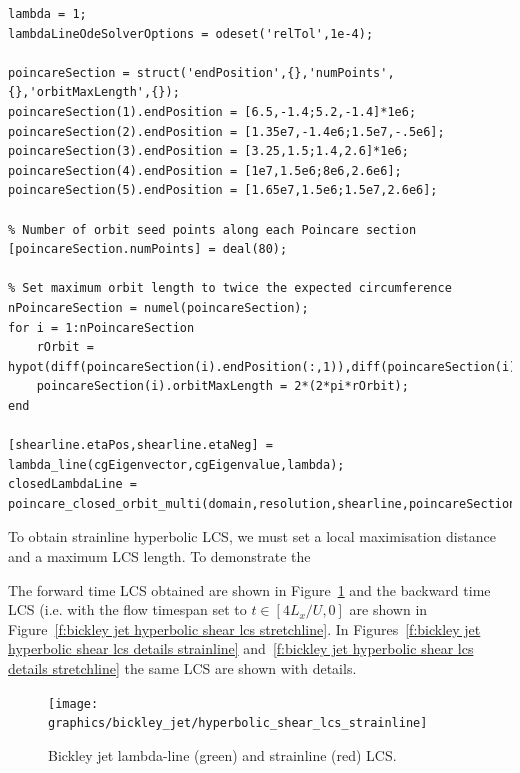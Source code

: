 \documentclass{article}
\begin{document}
\begin{lstlisting}[caption={LCS Tool commands Bickley jet lambda-lines, subset of \texttt{demo/bickley\_jet/hyperbolic\_shear\_lcs.m}.},label=l:Bickley jet lambda-line commands]
lambda = 1;
lambdaLineOdeSolverOptions = odeset('relTol',1e-4);

poincareSection = struct('endPosition',{},'numPoints',{},'orbitMaxLength',{});
poincareSection(1).endPosition = [6.5,-1.4;5.2,-1.4]*1e6;
poincareSection(2).endPosition = [1.35e7,-1.4e6;1.5e7,-.5e6];
poincareSection(3).endPosition = [3.25,1.5;1.4,2.6]*1e6;
poincareSection(4).endPosition = [1e7,1.5e6;8e6,2.6e6];
poincareSection(5).endPosition = [1.65e7,1.5e6;1.5e7,2.6e6];

% Number of orbit seed points along each Poincare section
[poincareSection.numPoints] = deal(80);

% Set maximum orbit length to twice the expected circumference
nPoincareSection = numel(poincareSection);
for i = 1:nPoincareSection
    rOrbit = hypot(diff(poincareSection(i).endPosition(:,1)),diff(poincareSection(i).endPosition(:,2)));
    poincareSection(i).orbitMaxLength = 2*(2*pi*rOrbit);
end

[shearline.etaPos,shearline.etaNeg] = lambda_line(cgEigenvector,cgEigenvalue,lambda);
closedLambdaLine = poincare_closed_orbit_multi(domain,resolution,shearline,poincareSection,'odeSolverOptions',lambdaLineOdeSolverOptions,'periodicBc',periodicBc);
\end{lstlisting}

To obtain strainline hyperbolic LCS, we must set a local maximisation distance and a maximum LCS length. To demonstrate the 

The forward time LCS obtained are shown in Figure~\ref{f:bickley jet hyperbolic shear lcs strainline} and the backward time LCS (i.e. with the flow timespan set to $t \in [4 L_x/U,0]$ are shown in Figure~\ref{f:bickley jet hyperbolic shear lcs stretchline}. In Figures~\ref{f:bickley jet hyperbolic shear lcs details strainline} and~\ref{f:bickley jet hyperbolic shear lcs details stretchline} the same LCS are shown with details.

\begin{figure}
\begin{center}
\texttt{[image: graphics/bickley\_jet/hyperbolic\_shear\_lcs\_strainline]}
\end{center}
\caption{Bickley jet lambda-line (green) and strainline (red) LCS.}
\label{f:bickley jet hyperbolic shear lcs strainline}
\end{figure}
\end{document}

